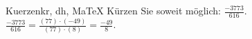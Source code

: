 \begin{MAufgabe}{Kuerzen}{kr, dh, MaTeX}
K\"urzen Sie soweit m\"oglich: $\frac{-3773}{616}$.\\ 
\ifLsg\MLoesung
\quad $\frac{-3773}{616}=\frac{(77)\cdot(-49)}{(77)\cdot(8)}=\frac{-49}{8}$.\else\relax\fi
 \end{MAufgabe}